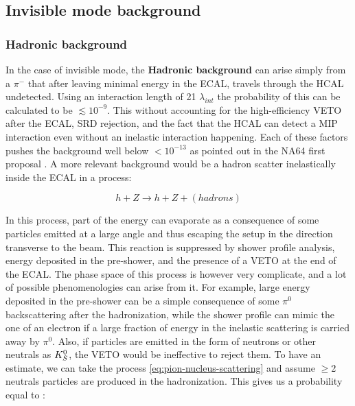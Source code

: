 \subsection{Invisible mode background}
\label{ch3:sec:bkg:inv}

\subsubsection{Hadronic background}
\label{ch3:sec:bkg:inv:hadr}


In the case of invisible mode, the \textbf{Hadronic background} can arise simply from a $\pi^-$ that after leaving minimal energy in the ECAL, travels through the HCAL undetected. Using an interaction length of 21 $\lambda_{int}$ the probability of this can be calculated to be $\lesssim 10^{-9}$. This without accounting for the high-efficiency VETO after the ECAL, SRD rejection, and the fact that the HCAL can detect a MIP interaction even without an inelastic interaction happening. Each of these factors pushes the background well below $<10^{-13}$ as pointed out in the NA64 first proposal \cite{Andreas:2013lya}. A more relevant background would be a hadron scatter inelastically inside the ECAL in a process:

\begin{equation}
  \label{eq:pion-nucleus-scattering}
  h + Z \longrightarrow h + Z + (hadrons)
\end{equation}

In this process, part of the energy can evaporate as a consequence of some particles emitted at a large angle and thus escaping the setup in the direction transverse to the beam. This reaction is suppressed by shower profile analysis, energy deposited in the pre-shower, and the presence of a VETO at the end of the ECAL. The phase space of this process is however very complicate, and a lot of possible phenomenologies can arise from it. For example, large energy deposited in the pre-shower can be a simple consequence of some $\pi^0$ backscattering after the hadronization, while the shower profile can mimic the one of an electron if a large fraction of energy in the inelastic scattering is carried away by $\pi^0$. Also, if particles are emitted in the form of neutrons or other neutrals as $K^0_S$, the VETO would be ineffective to reject them. To have an estimate, we can take the process \ref{eq:pion-nucleus-scattering} and assume $\geq$2 neutrals particles are produced in the hadronization. This gives us a probability equal to \cite{gkkk1}:

